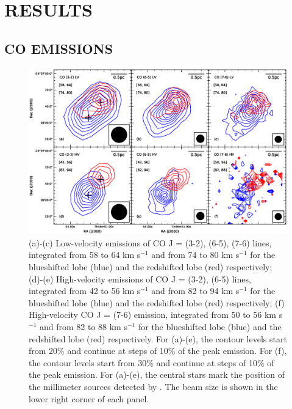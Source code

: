 \section{RESULTS}
\subsection{CO EMISSIONS}

\begin{figure}[htbp]
\includegraphics[scale=.60]{./fig/ori_contour.eps}
\caption{(a)-(c) Low-velocity emissions of CO J = (3-2), (6-5), (7-6) lines, integrated from 58 to 64 km s$^{-1} $ and from 74 to 80 km s$^{-1}$ for the blueshifted lobe (blue) and the redshifted lobe (red) respectively; (d)-(e) High-velocity emissions of CO J = (3-2), (6-5) lines, integrated from 42 to 56 km s$^{-1} $ and from 82 to 94 km s$^{-1}$ for the blueshifted lobe (blue) and  the redshifted lobe (red) respectively; (f) High-velocity CO J = (7-6) emission, integrated from  50 to 56 km s$^{-1} $ and from 82 to 88 km s$^{-1}$ for the blueshifted lobe (blue) and  the redshifted lobe (red) respectively. For (a)-(e), the contour levels start from 20\% and continue at steps of 10\% of the peak emission. For (f), the contour levels start from 30\% and continue at steps of 10\% of the peak emission. For (a)-(e), the central stars mark the position of the millimeter sources detected by \citet{2009ApJ...696...66Q}. The beam size is shown in the lower right corner of each panel.  \label{fig1}}
\end{figure}

